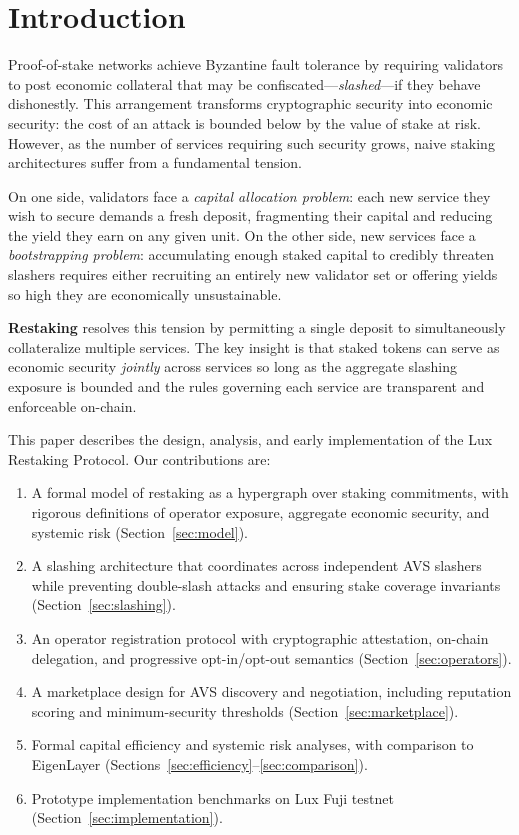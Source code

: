 \section{Introduction}


Proof-of-stake networks achieve Byzantine fault tolerance by requiring validators to post
economic collateral that may be confiscated---\emph{slashed}---if they behave dishonestly.
This arrangement transforms cryptographic security into economic security: the cost of an
attack is bounded below by the value of stake at risk. However, as the number of services
requiring such security grows, naive staking architectures suffer from a fundamental tension.

On one side, validators face a \emph{capital allocation problem}: each new service they wish
to secure demands a fresh deposit, fragmenting their capital and reducing the yield they
earn on any given unit. On the other side, new services face a \emph{bootstrapping problem}:
accumulating enough staked capital to credibly threaten slashers requires either recruiting
an entirely new validator set or offering yields so high they are economically unsustainable.

\textbf{Restaking} resolves this tension by permitting a single deposit to simultaneously
collateralize multiple services. The key insight is that staked tokens can serve as economic
security \emph{jointly} across services so long as the aggregate slashing exposure is bounded
and the rules governing each service are transparent and enforceable on-chain.

This paper describes the design, analysis, and early implementation of the Lux Restaking
Protocol. Our contributions are:

\begin{enumerate}[leftmargin=1.5em]
  \item A formal model of restaking as a hypergraph over staking commitments, with rigorous
    definitions of operator exposure, aggregate economic security, and systemic risk
    (Section~\ref{sec:model}).
  \item A slashing architecture that coordinates across independent AVS slashers while
    preventing double-slash attacks and ensuring stake coverage invariants
    (Section~\ref{sec:slashing}).
  \item An operator registration protocol with cryptographic attestation, on-chain delegation,
    and progressive opt-in/opt-out semantics (Section~\ref{sec:operators}).
  \item A marketplace design for AVS discovery and negotiation, including reputation scoring
    and minimum-security thresholds (Section~\ref{sec:marketplace}).
  \item Formal capital efficiency and systemic risk analyses, with comparison to EigenLayer
    (Sections~\ref{sec:efficiency}--\ref{sec:comparison}).
  \item Prototype implementation benchmarks on Lux Fuji testnet
    (Section~\ref{sec:implementation}).
\end{enumerate}


